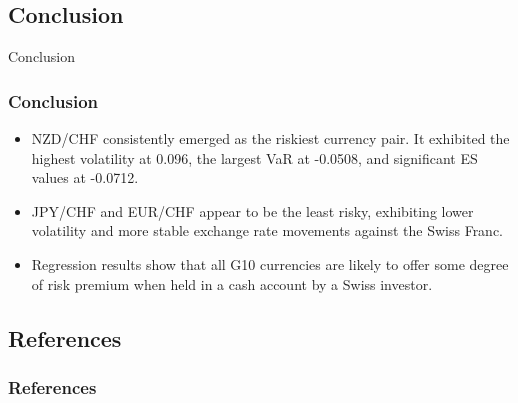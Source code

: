 \documentclass[10pt]{beamer}
\begin{document}
\begin{frame}
\section{Conclusion}
\centering \LARGE Conclusion
\end{frame}
\begin{frame}
\frametitle{Conclusion}
\begin{itemize}
    \item NZD/CHF consistently emerged as the riskiest currency pair. It exhibited the highest volatility at 0.096, the largest VaR at -0.0508, and significant ES values at -0.0712.
    \item JPY/CHF and EUR/CHF appear to be the least risky, exhibiting lower volatility and more stable exchange rate movements against the Swiss Franc. 
    \item Regression results show that all G10 currencies are likely to offer some degree of risk premium when held in a cash account by a Swiss investor.
\end{itemize}
\end{frame}
\begin{frame}
\section{References}
\frametitle{References}
\printbibliography
\end{frame}
\end{document}
